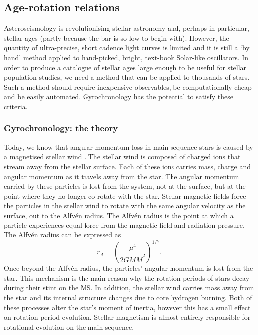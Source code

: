 \subsection{Age-rotation relations}

Asteroseismology is revolutionising stellar astronomy and, perhaps in
particular, stellar ages (partly because the bar is so low to begin with).
However, the quantity of ultra-precise, short cadence light curves is limited
and it is still a `by hand' method applied to hand-picked, bright, text-book
Solar-like oscillators.
In order to produce a catalogue of stellar ages large enough to be useful for
stellar population studies, we need a method that can be applied to thousands
of stars.
Such a method should require inexpensive observables, be computationally cheap
and be easily automated.
Gyrochronology has the potential to satisfy these criteria.

\subsubsection{Gyrochronology: the theory}

Today, we know that angular momentum loss in main sequence stars is caused by
a magnetised stellar wind \citep{Schatzman1962, Weber1967, Mestel1984}.
The stellar wind is composed of charged ions that stream away from the stellar
surface.
Each of these ions carries mass, charge and angular momentum as it travels
away from the star.
The angular momentum carried by these particles is lost from the system, not
at the surface, but at the point where they no longer co-rotate with the star.
Stellar magnetic fields force the particles in the stellar wind to rotate with
the same angular velocity as the surface, out to the Alfv{\'e}n radius.
The Alfv{\'e}n radius is the point at which a particle experiences equal force
from the magnetic field and radiation pressure.
The Alfv{\'e}n radius can be expressed as \citep{Rosswog2011}
\begin{equation}
r_A = \left( \frac{\mu^4}{2GM\dot{M}^2} \right)^{1/7}.
\end{equation}
Once beyond the Alfv{\'e}n radius, the particles' angular momentum is lost
from the star.
This mechanism is the main reason why the rotation periods of stars decay
during their stint on the MS.
In addition, the stellar wind carries mass away from the star and its
internal structure changes due to core hydrogen burning.
Both of these processes alter the star's moment of inertia, however this has
a small effect on rotation period evolution.
Stellar magnetism is almost entirely responsible for rotational evolution on
the main sequence.

